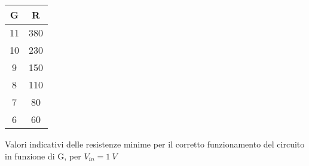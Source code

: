 \begin{tabular}{|c|c|}
\hline 
G & R \\ 
\hline 
11 & 380 \\ 
\hline 
10 & 230 \\ 
\hline 
9 & 150 \\ 
\hline 
8 & 110 \\ 
\hline 
7 & 80 \\ 
\hline 
6 & 60 \\ 
\hline 
\end{tabular} 
\caption{Valori indicativi delle resistenze minime per il corretto funzionamento del circuito in funzione di G, per $V_{in} = 1~V$}